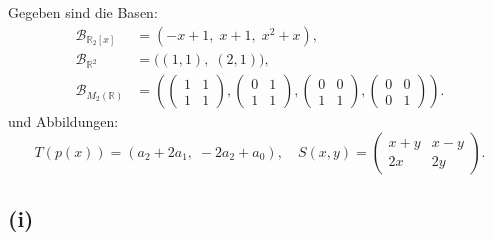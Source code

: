 \documentclass{article}
\begin{document}
Gegeben sind die Basen:
\begin{align*}
\mathcal{B}_{\mathbb{R}_2[x]} &= (-x+1,\; x+1,\; x^2+x), \\
\mathcal{B}_{\mathbb{R}^2} &= \big((1,1),\; (2,1)\big), \\
\mathcal{B}_{M_2(\mathbb{R})} &=
\left(
\begin{pmatrix}1&1\\1&1\end{pmatrix},
\begin{pmatrix}0&1\\1&1\end{pmatrix},
\begin{pmatrix}0&0\\1&1\end{pmatrix},
\begin{pmatrix}0&0\\0&1\end{pmatrix}
\right).
\end{align*}
und Abbildungen:
\[
T(p(x)) = (a_2 + 2a_1,\; -2a_2 + a_0),\quad S(x,y) = \begin{pmatrix}x+y & x-y\\ 2x & 2y\end{pmatrix}.
\]

\subsection*{(i)}
\end{document}
